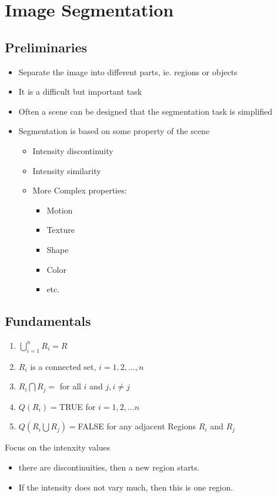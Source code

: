 \section{Image Segmentation}
\subsection{Preliminaries}
\begin{itemize}
\item Separate the image into different parts, ie. regions or objects
\item It is a difficult but important task
\item Often a scene can be designed that the segmentation task is simplified
\item Segmentation is based on some property of the scene
\begin{itemize}
\item Intensity discontinuity
\item Intensity similarity
\item More Complex properties:
\begin{itemize}
\item Motion
\item Texture
\item Shape
\item Color
\item etc.
\end{itemize}
\end{itemize}
\end{itemize}

\subsection{Fundamentals}
\begin{enumerate}
\item $\bigcup\limits_{i=1}^{n}R_i=R$
\item $R_i$ is a connected set, $i=1,2,...,n$
\item $R_i\bigcap R_j = $ for all $i$ and $j, i\neq j$
\item $Q(R_i)=$TRUE for $i=1,2,...n$
\item $Q(R_i\bigcup R_j)=$FALSE for any adjacent Regions $R_i$ and $R_j$
\end{enumerate}
Focus on the intenxity values
\begin{itemize}
\item there are discontinuities, then a new region starts.
\item If the intensity does not vary much, then this is one region.
\end{itemize}


